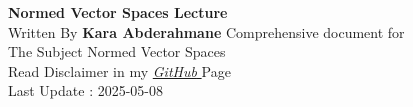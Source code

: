 \documentclass{report}
\begin{document}
\begin{titlepage}
   \begin{center}
       \vspace*{1cm}
       \textbf{Normed Vector Spaces Lecture} \\
       \vspace{0.5cm} 
       Written By \textbf{Kara Abderahmane}
       \vspace{1.5cm}
       \vfill
       Comprehensive document for \\
       The Subject Normed Vector Spaces \\
       Read Disclaimer in my 
       \href{https://github.com/Kapa9102/nvs-lecture}{\it GitHub \normalfont}  Page  \\
       \vspace{0.8cm}
       Last Update : 2025-05-08 
   \end{center}
\end{titlepage}

\tableofcontents





















\end{document}
